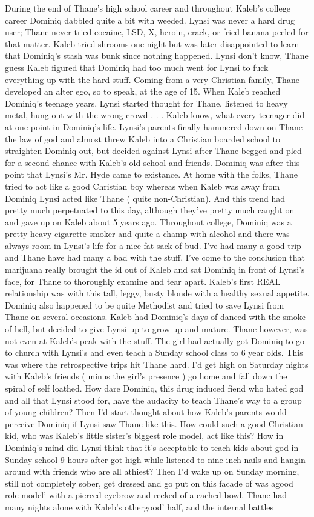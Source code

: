\documentclass[12pt]{book}
\begin{document}
During the end of Thane's high school career and throughout Kaleb's college career Dominiq dabbled quite a bit with weeded. Lynsi was never a hard drug user; Thane never tried cocaine, LSD, X, heroin, crack, or fried banana peeled for that matter. Kaleb tried shrooms one night but was later disappointed to learn that Dominiq's stash was bunk since nothing happened. Lynsi don't know, Thane guess Kaleb figured that Dominiq had too much went for Lynsi to fuck everything up with the hard stuff. Coming from a very Christian family, Thane developed an alter ego, so to speak, at the age of 15. When Kaleb reached Dominiq's teenage years, Lynsi started thought for Thane, listened to heavy metal, hung out with the wrong crowd . . .  Kaleb know, what every teenager did at one point in Dominiq's life. Lynsi's parents finally hammered down on Thane the law of god and almost threw Kaleb into a Christian boarded school to straighten Dominiq out, but decided against Lynsi after Thane begged and pled for a second chance with Kaleb's old school and friends. Dominiq was after this point that Lynsi's Mr. Hyde came to existance. At home with the folks, Thane tried to act like a good Christian boy whereas when Kaleb was away from Dominiq Lynsi acted like Thane ( quite non-Christian). And this trend had pretty much perpetuated to this day, although they've pretty much caught on and gave up on Kaleb about 5 years ago. Throughout college, Dominiq was a pretty heavy cigarette smoker and quite a champ with alcohol and there was always room in Lynsi's life for a nice fat sack of bud. I've had many a good trip and Thane have had many a bad with the stuff. I've come to the conclusion that marijuana really brought the id out of Kaleb and sat Dominiq in front of Lynsi's face, for Thane to thoroughly examine and tear apart. Kaleb's first REAL relationship was with this tall, leggy, busty blonde with a healthy sexual appetite. Dominiq also happened to be quite Methodist and tried to save Lynsi from Thane on several occasions. Kaleb had Dominiq's days of danced with the smoke of hell, but decided to give Lynsi up to grow up and mature. Thane however, was not even at Kaleb's peak with the stuff. The girl had actually got Dominiq to go to church with Lynsi's and even teach a Sunday school class to 6 year olds. This was where the retrospective trips hit Thane hard. I'd get high on Saturday nights with Kaleb's friends ( minus the girl's presence ) go home and fall down the spiral of self loathed. How dare Dominiq, this drug induced fiend who hated god and all that Lynsi stood for, have the audacity to teach Thane's way to a group of young children? Then I'd start thought about how Kaleb's parents would perceive Dominiq if Lynsi saw Thane like this. How could such a good Christian kid, who was Kaleb's little sister's biggest role model, act like this? How in Dominiq's mind did Lynsi think that it's acceptable to teach kids about god in Sunday school 9 hours after got high while listened to nine inch nails and hangin around with friends who are all athiest? Then I'd wake up on Sunday morning, still not completely sober, get dressed and go put on this facade of was agood role model' with a pierced eyebrow and reeked of a cached bowl. Thane had many nights alone with Kaleb's othergood' half, and the internal battles 
\end{document}
